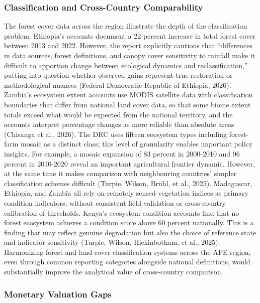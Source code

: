 \documentclass[
  letterpaper,
  DIV=11,
  numbers=noendperiod]{scrartcl}
\begin{document}
\subsubsection{Classification and Cross-Country
Comparability}\label{classification-and-cross-country-comparability}

The forest cover data across the region illustrate the depth of the
classification problem. Ethiopia's accounts document a 22 percent
increase in total forest cover between 2013 and 2022. However, the
report explicitly cautions that ``differences in data sources, forest
definitions, and canopy cover sensitivity to rainfall make it difficult
to apportion change between ecological dynamics and reclassification,''
putting into question whether observed gains represent true restoration
or methodological nuances (Federal Democratic Republic of Ethiopia,
2026). Zambia's ecosystem extent accounts use MODIS satellite data with
classification boundaries that differ from national land cover data, so
that some biome extent totals exceed what would be expected from the
national territory, and the accounts interpret percentage changes as
more reliable than absolute areas (Chisanga et al., 2026). The DRC uses
fifteen ecosystem types including forest-farm mosaic as a distinct
class; this level of granularity enables important policy insights. For
example, a mosaic expansion of 83 percent in 2000-2010 and 96 percent in
2010-2020 reveal an important agricultural frontier dynamic. However, at
the same time it makes comparison with neighbouring countries' simpler
classification schemes difficult (Turpie, Wilson, Brühl, et al., 2025).
Madagascar, Ethiopia, and Zambia all rely on remotely sensed vegetation
indices as primary condition indicators, without consistent field
validation or cross-country calibration of thresholds. Kenya's ecosystem
condition accounts find that no forest ecosystem achieves a condition
score above 60 percent nationally. This is a finding that may reflect
genuine degradation but also the choice of reference state and indicator
sensitivity (Turpie, Wilson, Hickinbotham, et al., 2025). Harmonizing
forest and land cover classification systems across the AFE region, even
through common reporting categories alongside national definitions,
would substantially improve the analytical value of cross-country
comparison.

\subsubsection{Monetary Valuation Gaps}\label{monetary-valuation-gaps}
\end{document}
